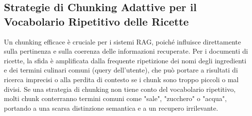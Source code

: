 \documentclass[a4paper, 11pt]{article}
\begin{document}
\subsection{Strategie di Chunking Adattive per il Vocabolario Ripetitivo delle Ricette}
Un chunking efficace è cruciale per i sistemi RAG, poiché influisce direttamente sulla pertinenza e sulla coerenza delle informazioni recuperate. \cite{semantic_chunking_multimodal} Per i documenti di ricette, la sfida è amplificata dalla frequente ripetizione dei nomi degli ingredienti e dei termini culinari comuni (query dell'utente), che può portare a risultati di ricerca imprecisi o alla perdita di contesto se i chunk sono troppo piccoli o mal divisi. \cite{chunking_strategies_pinecone} Se una strategia di chunking non tiene conto del vocabolario ripetitivo, molti chunk conterranno termini comuni come "sale", "zucchero" o "acqua", portando a una scarsa distinzione semantica e a un recupero irrilevante. \cite{semantic_chunking_ani}
\end{document}
